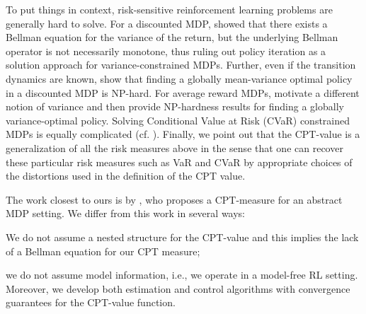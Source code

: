 To put things in context, risk-sensitive reinforcement learning problems are generally hard to solve. 
For a discounted MDP, \citet{Sobel82VD} showed that there exists a Bellman equation for the variance of the return, but the underlying Bellman operator is not necessarily monotone, thus ruling out policy iteration as a solution approach for variance-constrained MDPs.
Further, even if the transition dynamics are known, \citet{mannor2013algorithmic} show that finding a globally mean-variance optimal policy in a discounted MDP is NP-hard.
For average reward MDPs, \citet{filar1989variance} motivate a different notion of variance and then provide NP-hardness results for finding a globally variance-optimal policy.
Solving Conditional Value at Risk (CVaR) constrained MDPs is equally complicated (cf. \citealt{borkar2010risk,prashanth2014policy,tamar2014optimizing}). 
Finally, we point out that the CPT-value is a generalization of all the risk measures above in the sense that one can recover these particular risk measures such as VaR and CVaR by appropriate choices of the distortions used in the definition of the CPT value.

The work closest to ours is by \citet{lin2013stochastic}, who proposes a CPT-measure for an abstract MDP setting.
 We differ from this work in several ways:
\begin{inparaenum}[\it (i)]
\item We do not assume a nested structure for the CPT-value %
and this implies the lack of a Bellman equation for our CPT measure;
\item we do not assume model information, i.e., we operate in a model-free RL setting. Moreover, we develop both estimation and control algorithms with convergence guarantees for the CPT-value function.
\end{inparaenum}

